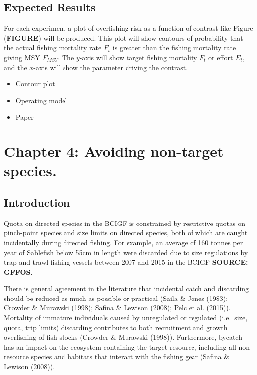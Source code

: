 \documentclass[12pt,]{scrartcl}
\providecommand{\tightlist}{%
  \setlength{\itemsep}{0pt}\setlength{\parskip}{0pt}}
\begin{document}
\subsection{Expected Results}\label{expected-results-2}

For each experiment a plot of overfishing risk as a function of contrast
like Figure (\textbf{FIGURE}) will be produced. This plot will show
contours of probability that the actual fishing mortality rate \(F_t\)
is greater than the fishing mortality rate giving MSY \(F_{MSY}\). The
\(y\)-axis will show target fishing mortality \(F_t\) or effort \(E_t\),
and the \(x\)-axis will show the parameter driving the contrast.

\begin{itemize}
\tightlist
\item
  Contour plot
\item
  Operating model
\item
  Paper
\end{itemize}

\section{Chapter 4: Avoiding non-target
species.}\label{chapter-4-avoiding-non-target-species.}

\subsection{Introduction}\label{introduction-1}

Quota on directed species in the BCIGF is constrained by restrictive
quotas on pinch-point species and size limits on directed species, both
of which are caught incidentally during directed fishing. For example,
an average of 160 tonnes per year of Sablefish below 55cm in length were
discarded due to size regulations by trap and trawl fishing vessels
between 2007 and 2015 in the BCIGF \textbf{SOURCE: GFFOS}.

There is general agreement in the literature that incidental catch and
discarding should be reduced as much as possible or practical (Saila \&
Jones (1983); Crowder \& Murawski (1998); Safina \& Lewison (2008); Pelc
et al. (2015)). Mortality of immature individuals caused by unregulated
or regulated (i.e.~size, quota, trip limits) discarding contributes to
both recruitment and growth overfishing of fish stocks (Crowder \&
Murawski (1998)). Furthermore, bycatch has an impact on the ecosystem
containing the target resource, including all non-resource species and
habitats that interact with the fishing gear (Safina \& Lewison (2008)).
\end{document}
